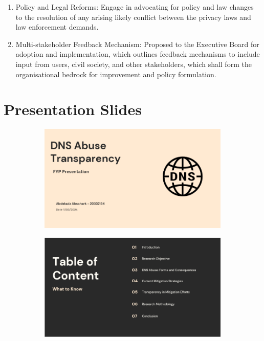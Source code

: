 \begin{itemize}
\begin{enumerate}
    \item Policy and Legal Reforms: Engage in advocating for policy and law changes to the resolution of any arising likely conflict between the privacy laws and law enforcement demands. 
    \item Multi-stakeholder Feedback Mechanism: Proposed to the Executive Board for adoption and implementation, which outlines feedback mechanisms to include input from users, civil society, and other stakeholders, which shall form the organisational bedrock for improvement and policy formulation.
    \end{enumerate}
        
    
\end{itemize}





\section{Presentation Slides}

\begin{figure}[H]
  \centering
  \begin{subfigure}[b]{0.55\linewidth}
    \includegraphics[width=\linewidth]{appendix/PRE1.png}
    \label{fig:left}
  \end{subfigure}
  \hfill %
  \begin{subfigure}[b]{0.55\linewidth}
    \includegraphics[width=\linewidth]{appendix/PRE2.png}
    \label{fig:right}
  \end{subfigure}
  \label{fig:images}
\end{figure}

